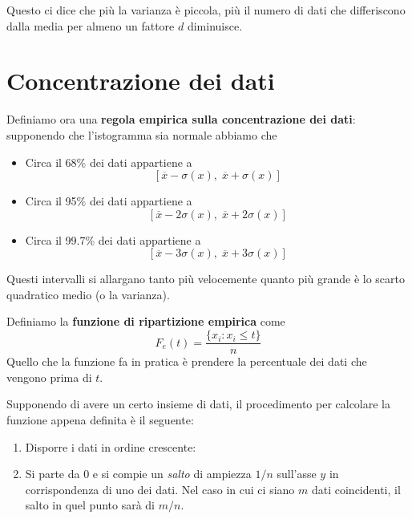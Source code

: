 \begin{observation}
	Questo ci dice che più la varianza è piccola, più il numero di dati che differiscono dalla
	media per almeno un fattore $d$ diminuisce.
\end{observation}

\section{Concentrazione dei dati}
\begin{definition}
	Definiamo ora una \textbf{regola empirica sulla concentrazione dei dati}: supponendo che
	l'istogramma sia normale abbiamo che
	\begin{itemize}
		\item Circa il 68\% dei dati appartiene a
		      \[ [ \overline{x} - \sigma(x),\; \overline{x} + \sigma(x) ] \]
		\item Circa il 95\% dei dati appartiene a
		      \[ [ \overline{x} - 2 \sigma(x),\; \overline{x} + 2 \sigma(x) ] \]
		\item Circa il 99.7\% dei dati appartiene a
		      \[ [ \overline{x} - 3 \sigma(x),\; \overline{x} + 3 \sigma(x) ] \]
	\end{itemize}
	Questi intervalli si allargano tanto più velocemente quanto più grande è lo scarto quadratico
	medio (o la varianza).
\end{definition}

\begin{definition}
	Definiamo la \textbf{funzione di ripartizione empirica} come
	\[ F_e(t) = \frac{\{ x_i : x_i \leq t \}}{n} \]
	Quello che la funzione fa in pratica è prendere la percentuale dei dati che vengono prima di
	$t$.
\end{definition}

Supponendo di avere un certo insieme di dati, il procedimento per calcolare la funzione appena
definita è il seguente:
\begin{enumerate}
	\item Disporre i dati in ordine crescente:
	\item Si parte da 0 e si compie un \emph{salto} di ampiezza $1 / n$ sull'asse $y$ in
	      corrispondenza di uno dei dati. Nel caso in cui ci siano $m$ dati coincidenti, il salto
	      in quel punto sarà di $m / n$.
\end{enumerate}

